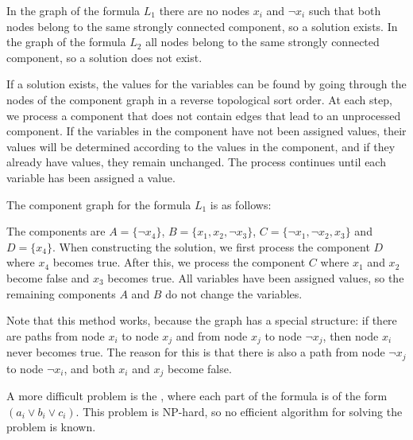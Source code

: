 In the graph of the formula $L_1$
there are no nodes $x_i$ and $\lnot x_i$
such that both nodes 
belong to the same strongly connected component,
so a solution exists.
In the graph of the formula $L_2$
all nodes belong to the same strongly connected component,
so a solution does not exist.

If a solution exists, the values for the variables
can be found by going through the nodes of the
component graph in a reverse topological sort order.
At each step, we process a component 
that does not contain edges that lead to an
unprocessed component.
If the variables in the component
have not been assigned values,
their values will be determined
according to the values in the component,
and if they already have values,
they remain unchanged.
The process continues until each variable
has been assigned a value.

The component graph for the formula $L_1$ is as follows:
\begin{center}
\end{center}

The components are
$A = \{\lnot x_4\}$,
$B = \{x_1, x_2, \lnot x_3\}$,
$C = \{\lnot x_1, \lnot x_2, x_3\}$ and
$D = \{x_4\}$.
When constructing the solution,
we first process the component $D$
where $x_4$ becomes true.
After this, we process the component $C$
where $x_1$ and $x_2$ become false
and $x_3$ becomes true.
All variables have been assigned values,
so the remaining components $A$ and $B$
do not change the variables.

Note that this method works, because the
graph has a special structure:
if there are paths from node $x_i$ to node $x_j$
and from node $x_j$ to node $\lnot x_j$,
then node $x_i$ never becomes true.
The reason for this is that there is also
a path from node $\lnot x_j$ to node $\lnot x_i$,
and both $x_i$ and $x_j$ become false.


A more difficult problem is the ,
where each part of the formula is of the form
$(a_i \lor b_i \lor c_i)$.
This problem is NP-hard, so no efficient algorithm
for solving the problem is known.
